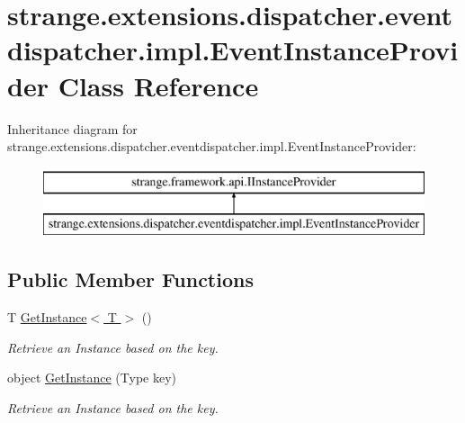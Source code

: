 \hypertarget{classstrange_1_1extensions_1_1dispatcher_1_1eventdispatcher_1_1impl_1_1_event_instance_provider}{\section{strange.\-extensions.\-dispatcher.\-eventdispatcher.\-impl.\-Event\-Instance\-Provider Class Reference}
\label{classstrange_1_1extensions_1_1dispatcher_1_1eventdispatcher_1_1impl_1_1_event_instance_provider}
}
Inheritance diagram for strange.\-extensions.\-dispatcher.\-eventdispatcher.\-impl.\-Event\-Instance\-Provider\-:\begin{figure}[H]
\begin{center}
\leavevmode
\includegraphics[height=2.000000cm]{classstrange_1_1extensions_1_1dispatcher_1_1eventdispatcher_1_1impl_1_1_event_instance_provider}
\end{center}
\end{figure}
\subsection*{Public Member Functions}
\begin{DoxyCompactItemize}
\item 
T \hyperlink{classstrange_1_1extensions_1_1dispatcher_1_1eventdispatcher_1_1impl_1_1_event_instance_provider_a0495fd565e76da8d0262359643c40084}{Get\-Instance$<$ T $>$} ()
\begin{DoxyCompactList}\small\item\em Retrieve an Instance based on the key. \end{DoxyCompactList}\item 
object \hyperlink{classstrange_1_1extensions_1_1dispatcher_1_1eventdispatcher_1_1impl_1_1_event_instance_provider_a97615ec61f13f35a6ab9127f9c4f888c}{Get\-Instance} (Type key)
\begin{DoxyCompactList}\small\item\em Retrieve an Instance based on the key. \end{DoxyCompactList}\end{DoxyCompactItemize}


